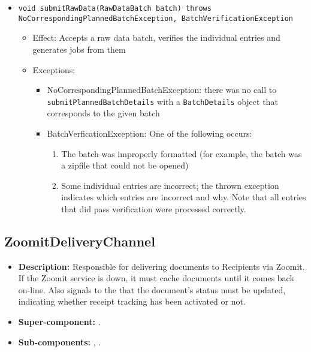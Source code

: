 \begin{itemize}
\begin{itemize}
    	\item \texttt{void submitRawData(RawDataBatch batch) throws NoCorrespondingPlannedBatchException, BatchVerificationException}
    	\begin{itemize}
    		\item Effect: Accepts a raw data batch, verifies the individual entries and generates jobs from them
    		\item Exceptions:
    		\begin{itemize}
    			\item NoCorrespondingPlannedBatchException: there was no call to \texttt{submitPlannedBatchDetails} with a \texttt{BatchDetails} object that corresponds to the given batch
    			\item BatchVerficationException: One of the following occurs:
    			\begin{enumerate}
    				\item The batch was improperly formatted (for example, the batch was a zipfile that could not be opened)
    				\item Some individual entries are incorrect; the thrown exception indicates which entries are incorrect and why. Note that all entries that did pass verification were processed correctly.
    			\end{enumerate} 
    		\end{itemize}
    	\end{itemize}
    \end{itemize}
\end{itemize}

\subsection{ZoomitDeliveryChannel}
\begin{itemize}
    \item \textbf{Description:} Responsible for delivering documents to Recipients via Zoomit. If the Zoomit service is down, it must cache documents until it comes back on-line. Also signals to the  that the document's status must be updated, indicating whether receipt tracking has been activated or not.
    \item \textbf{Super-component:} .
    \item \textbf{Sub-components:} , .
\end{itemize}

